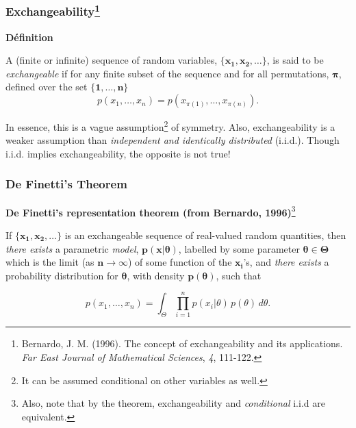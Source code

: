 \documentclass{beamer}
\begin{document}

\begin{frame}
    \frametitle{Exchangeability\footnote{
        Bernardo, J. M. (1996).
        The concept of exchangeability and its applications.
        \emph{Far East Journal of Mathematical Sciences}, \emph{4}, 111-122.
    }}
    \textbf{Définition}

    \vfill

    A (finite or infinite) sequence of random variables, $\boldsymbol{\{x_1, x_2, \ldots\}}$,
    is said to be \emph{exchangeable} if for any finite subset of the sequence
    and for all permutations, $\boldsymbol{\pi}$, defined over the set $\boldsymbol{\{1, \ldots, n\}}$
    \[p(x_1, \ldots, x_n) = p(x_{\pi(1)}, \ldots, x_{\pi(n)}).\]

    \vfill

    In essence, this is a vague assumption\footnote{
    It can be assumed conditional on other variables as well.} of symmetry.
    Also, exchangeability is a weaker assumption than \emph{independent and identically distributed} (i.i.d.).
    Though i.i.d. implies exchangeability, the opposite is not true!
\end{frame}

\begin{frame}
    \frametitle{De Finetti's Theorem}

    \vfill
    
    \textbf{De Finetti's representation theorem (from Bernardo, 1996)}\footnote{
    Also, note that by the theorem, exchangeability and \emph{conditional} i.i.d are equivalent.}

    \vfill

    If $\boldsymbol{\{x_1, x_2, \ldots\}}$ is an exchangeable sequence of real-valued random quantities,
    then \emph{there exists} a parametric \emph{model}, $\boldsymbol{p(x | \theta)}$, labelled by some
    parameter $\boldsymbol{\theta \in \Theta}$ which is the limit (as $\boldsymbol{n \to \infty}$)
    of some function of the $\boldsymbol{x_i}$'s, and \emph{there exists} a probability distribution
    for $\boldsymbol{\theta}$, with density $\boldsymbol{p(\theta)}$, such that

    \[p(x_1, \ldots, x_n) = \int_{\Theta} \prod_{i = 1}^{n} p(x_i | \theta) \, p(\theta) \, d\theta.\]
\end{frame}
\end{document}

